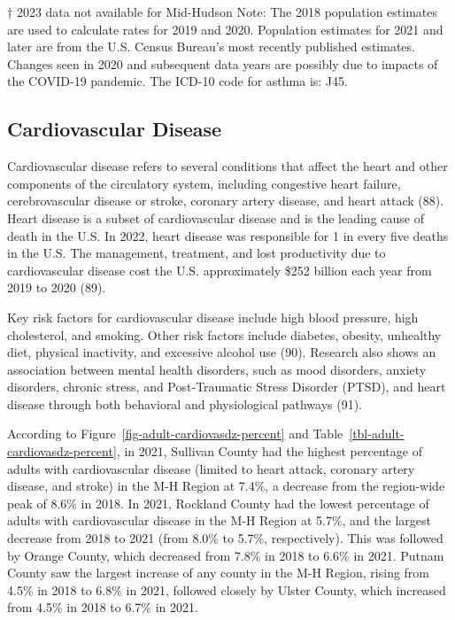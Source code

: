 \documentclass[
  english,
  letterpaper,
]{report}
\begin{document}
\begin{tcolorbox}[enhanced jigsaw, breakable, leftrule=.75mm, title=\textcolor{quarto-callout-note-color}{\faInfo}\hspace{0.5em}{Note}, bottomrule=.15mm, opacityback=0, left=2mm, colback=white, bottomtitle=1mm, coltitle=black, colbacktitle=quarto-callout-note-color!10!white, colframe=quarto-callout-note-color-frame, opacitybacktitle=0.6, toptitle=1mm, titlerule=0mm, arc=.35mm, rightrule=.15mm, toprule=.15mm]

† 2023 data not available for Mid-Hudson Note: The 2018 population
estimates are used to calculate rates for 2019 and 2020. Population
estimates for 2021 and later are from the U.S. Census Bureau's most
recently published estimates. Changes seen in 2020 and subsequent data
years are possibly due to impacts of the COVID-19 pandemic. The ICD-10
code for asthma is: J45.

\end{tcolorbox}

\subsection{Cardiovascular Disease}\label{cardiovascular-disease}

Cardiovascular disease refers to several conditions that affect the
heart and other components of the circulatory system, including
congestive heart failure, cerebrovascular disease or stroke, coronary
artery disease, and heart attack (88). Heart disease is a subset of
cardiovascular disease and is the leading cause of death in the U.S. In
2022, heart disease was responsible for 1 in every five deaths in the
U.S. The management, treatment, and lost productivity due to
cardiovascular disease cost the U.S. approximately \$252 billion each
year from 2019 to 2020 (89).

Key risk factors for cardiovascular disease include high blood pressure,
high cholesterol, and smoking. Other risk factors include diabetes,
obesity, unhealthy diet, physical inactivity, and excessive alcohol use
(90). Research also shows an association between mental health
disorders, such as mood disorders, anxiety disorders, chronic stress,
and Post-Traumatic Stress Disorder (PTSD), and heart disease through
both behavioral and physiological pathways (91).

According to Figure~\ref{fig-adult-cardiovasdz-percent} and
Table~\ref{tbl-adult-cardiovasdz-percent}, in 2021, Sullivan County had
the highest percentage of adults with cardiovascular disease (limited to
heart attack, coronary artery disease, and stroke) in the M-H Region at
7.4\%, a decrease from the region-wide peak of 8.6\% in 2018. In 2021,
Rockland County had the lowest percentage of adults with cardiovascular
disease in the M-H Region at 5.7\%, and the largest decrease from 2018
to 2021 (from 8.0\% to 5.7\%, respectively). This was followed by Orange
County, which decreased from 7.8\% in 2018 to 6.6\% in 2021. Putnam
County saw the largest increase of any county in the M-H Region, rising
from 4.5\% in 2018 to 6.8\% in 2021, followed closely by Ulster County,
which increased from 4.5\% in 2018 to 6.7\% in 2021.
\end{document}
